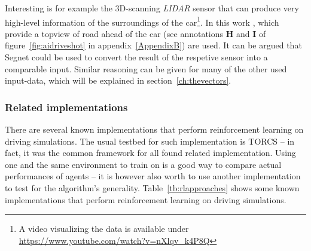 Interesting is for example the 3D-scanning \textit{LIDAR} sensor that can produce very high-level information of the surroundings of the car\footnote{A video visualizing the data is available under \url{https://www.youtube.com/watch?v=nXlqv_k4P8Q}}. In this work , which provide a topview of road ahead of the car (see annotations \textbf{H} and \textbf{I} of figure~\ref{fig:aidriveshot} in appendix~\ref{AppendixB}) are used. It can be argued that Segnet\cite{badrinarayanan_segnet:_2015} could be used to convert the result of the respetive sensor into a comparable input. Similar reasoning can be given for many of the other used input-data, which will be explained in section~\ref{ch:thevectors}.


\subsubsection{Related implementations}

\label{sec:relatedimplements}

There are several known implementations that perform reinforcement learning on driving simulations. The usual testbed for such implementation is TORCS -- in fact, it was the common framework for all found related implementation. Using one and the same environment to train on is a good way to compare actual performances of agents -- it is however also worth to use another implementation to test for the algorithm's generality. Table~\ref{tb:rlapproaches} shows some known implementations that perform reinforcement learning on driving simulations. 

